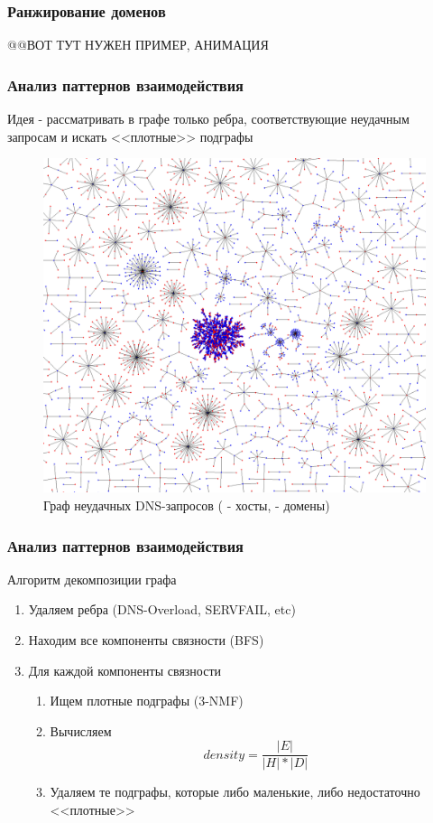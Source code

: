 \documentclass[10pt,pdf,hyperref={unicode}]{beamer}
\begin{document}
\begin{frame}
\frametitle{Ранжирование доменов}
@@ВОТ ТУТ НУЖЕН ПРИМЕР, АНИМАЦИЯ
\end{frame}

\begin{frame}
\frametitle{Анализ паттернов взаимодействия}
Идея - рассматривать в графе только ребра, соответствующие неудачным запросам и искать <<плотные>> подграфы
\begin{figure}[H]
	\centering
	\includegraphics[scale=0.14]{img/fail-graph.png}
	\caption{Граф неудачных DNS-запросов ( - хосты,  - домены)}
\end{figure}
\end{frame}

\begin{frame}
\frametitle{Анализ паттернов взаимодействия}
Алгоритм декомпозиции графа
\begin{enumerate}
	\item Удаляем ребра (DNS-Overload, SERVFAIL, etc)
	\item Находим все компоненты связности (BFS)
	\item Для каждой компоненты связности
	\begin{enumerate}
		\item Ищем плотные подграфы (3-NMF)
		\item Вычисляем $$density = \frac{|E|}{|H|*|D|}$$
		\item Удаляем те подграфы, которые либо маленькие, либо недостаточно <<плотные>>
	\end{enumerate}
\end{enumerate}
\end{frame}
\end{document}
